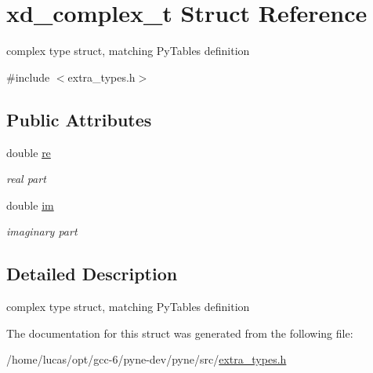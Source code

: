 \hypertarget{structxd__complex__t}{}\section{xd\+\_\+complex\+\_\+t Struct Reference}
\label{structxd__complex__t}


complex type struct, matching Py\+Tables definition  




{\ttfamily \#include $<$extra\+\_\+types.\+h$>$}

\subsection*{Public Attributes}
\begin{DoxyCompactItemize}
\item 
double \hyperlink{structxd__complex__t_afbbb6ed1fe3b729258421cb3eaa8c4d8}{re}\hypertarget{structxd__complex__t_afbbb6ed1fe3b729258421cb3eaa8c4d8}{}\label{structxd__complex__t_afbbb6ed1fe3b729258421cb3eaa8c4d8}

\begin{DoxyCompactList}\small\item\em real part \end{DoxyCompactList}\item 
double \hyperlink{structxd__complex__t_afb1d09ccfa0e10044572c8a7bf4806f2}{im}\hypertarget{structxd__complex__t_afb1d09ccfa0e10044572c8a7bf4806f2}{}\label{structxd__complex__t_afb1d09ccfa0e10044572c8a7bf4806f2}

\begin{DoxyCompactList}\small\item\em imaginary part \end{DoxyCompactList}\end{DoxyCompactItemize}


\subsection{Detailed Description}
complex type struct, matching Py\+Tables definition 

The documentation for this struct was generated from the following file\+:\begin{DoxyCompactItemize}
\item 
/home/lucas/opt/gcc-\/6/pyne-\/dev/pyne/src/\hyperlink{extra__types_8h}{extra\+\_\+types.\+h}\end{DoxyCompactItemize}
